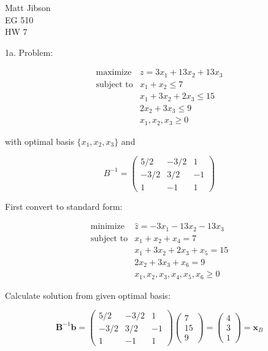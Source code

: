 \documentclass{article}
\begin{document}
\begin{flushright}
Matt Jibson \\
EG 510 \\
HW 7
\end{flushright}

1a. Problem:

\begin{displaymath}
\begin{array}{ll}
\textrm{maximize} & z = 3x_1 + 13x_2 + 13x_3 \\
\textrm{subject to} & x_1 + x_2 \le 7\\
& x_1 + 3x_2 + 2x_3 \le 15 \\
& 2x_2 + 3x_3 \le 9 \\
& x_1, x_2, x_3 \ge 0
\end{array}
\end{displaymath}

with optimal basis $\{x_1, x_2, x_3\}$ and

\begin{displaymath}
B^{-1} = \left( \begin{array}{rrr}
5/2 & -3/2 & 1 \\
-3/2 & 3/2 & -1 \\
1 & -1 & 1
\end{array} \right)
\end{displaymath}

First convert to standard form:

\begin{displaymath}
\begin{array}{ll}
\textrm{minimize} & \hat{z} = -3x_1 - 13x_2 - 13x_3 \\
\textrm{subject to} & x_1 + x_2 + x_4 = 7\\
& x_1 + 3x_2 + 2x_3 + x_5 = 15 \\
& 2x_2 + 3x_3 + x_6 = 9\\
& x_1, x_2, x_3, x_4, x_5, x_6 \ge 0
\end{array}
\end{displaymath}

Calculate solution from given optimal basis:

\begin{displaymath}
\textbf{B}^{-1}\textbf{b} = \left( \begin{array}{rrr}
5/2 & -3/2 & 1 \\
-3/2 & 3/2 & -1 \\
1 & -1 & 1
\end{array} \right)
\left( \begin{array}{c} 7 \\ 15 \\ 9 \end{array} \right) = \left( \begin{array}{c} 4 \\ 3 \\ 1 \end{array} \right) = \textbf{x}_B
\end{displaymath}
\end{document}
